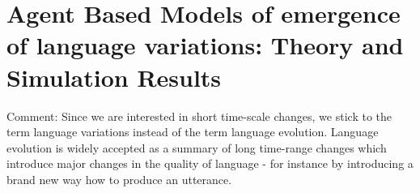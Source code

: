 \chapter{Agent Based Models of emergence of language variations: Theory and Simulation Results}
\label{ch:Theory}
Comment: Since we are interested in short time-scale changes, we stick to the term language variations instead of the term language evolution.
Language evolution is widely accepted as a summary of long time-range changes which introduce major changes in the quality of language - for instance by introducing a brand new way how to produce an utterance.
